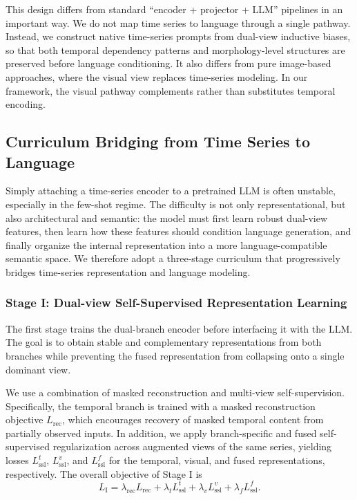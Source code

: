\documentclass{article}
\begin{document}
    This design differs from standard ``encoder + projector + LLM'' pipelines in an important way.
    We do not map time series to language through a single pathway.
    Instead, we construct native time-series prompts from dual-view inductive biases, so that both temporal dependency patterns and morphology-level structures are preserved before language conditioning.
    It also differs from pure image-based approaches, where the visual view replaces time-series modeling.
    In our framework, the visual pathway complements rather than substitutes temporal encoding.
    
    \subsection{Curriculum Bridging from Time Series to Language}
    
    Simply attaching a time-series encoder to a pretrained LLM is often unstable, especially in the few-shot regime.
    The difficulty is not only representational, but also architectural and semantic: the model must first learn robust dual-view features, then learn how these features should condition language generation, and finally organize the internal representation into a more language-compatible semantic space.
    We therefore adopt a three-stage curriculum that progressively bridges time-series representation and language modeling.
    
        \subsubsection{Stage I: Dual-view Self-Supervised Representation Learning}
        
        The first stage trains the dual-branch encoder before interfacing it with the LLM.
        The goal is to obtain stable and complementary representations from both branches while preventing the fused representation from collapsing onto a single dominant view.
        
        We use a combination of masked reconstruction and multi-view self-supervision.
        Specifically, the temporal branch is trained with a masked reconstruction objective $L_{\mathrm{rec}}$, which encourages recovery of masked temporal content from partially observed inputs.
        In addition, we apply branch-specific and fused self-supervised regularization across augmented views of the same series, yielding losses $L_{\mathrm{ssl}}^{t}$, $L_{\mathrm{ssl}}^{v}$, and $L_{\mathrm{ssl}}^{f}$ for the temporal, visual, and fused representations, respectively.
        The overall objective of Stage I is
        \begin{equation}
        L_{\mathrm{I}}
        =
        \lambda_{\mathrm{rec}} L_{\mathrm{rec}}
        +
        \lambda_t L_{\mathrm{ssl}}^{t}
        +
        \lambda_v L_{\mathrm{ssl}}^{v}
        +
        \lambda_f L_{\mathrm{ssl}}^{f}.
        \end{equation}
        
\end{document}
